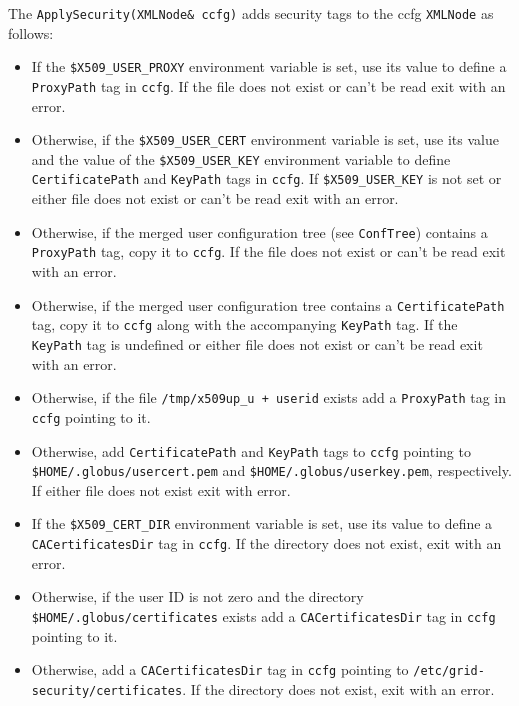 \documentclass{book}
\newcommand{\XMLNode}{\texttt{XMLNode}}
\begin{document}
The \texttt{ApplySecurity(XMLNode\& ccfg)} adds security tags to the
ccfg {\XMLNode} as follows:

\begin{itemize}
\item{If the \texttt{\$X509\_USER\_PROXY} environment variable is set,
  use its value to define a \texttt{ProxyPath} tag in \texttt{ccfg}. If
  the file does not exist or can't be read exit with an error.}
\item{Otherwise, if the \texttt{\$X509\_USER\_CERT} environment
  variable is set, use its value and the value of the
  \texttt{\$X509\_USER\_KEY} environment variable to define
  \texttt{CertificatePath} and \texttt{KeyPath} tags in \texttt{ccfg}.
  If \texttt{\$X509\_USER\_KEY} is not set or either file does not
  exist or can't be read exit with an error.}
\item{Otherwise, if the merged user configuration tree (see
  \texttt{ConfTree}) contains a \texttt{ProxyPath} tag, copy it to
  \texttt{ccfg}. If the file does not exist or can't be read exit with
  an error.}
\item{Otherwise, if the merged user configuration tree contains a
  \texttt{CertificatePath} tag, copy it to \texttt{ccfg} along with the
  accompanying \texttt{KeyPath} tag. If the \texttt{KeyPath} tag is
  undefined or either file does not exist or can't be read exit with
  an error.}
\item{Otherwise, if the file \texttt{/tmp/x509up\_u + userid} exists
  add a \texttt{ProxyPath} tag in \texttt{ccfg} pointing to it.}
\item{Otherwise, add \texttt{CertificatePath} and \texttt{KeyPath}
  tags to \texttt{ccfg} pointing to
  \texttt{\$HOME/.globus/usercert.pem} and
  \texttt{\$HOME/.globus/userkey.pem}, respectively. If either file
  does not exist exit with error.}
\item{If the \texttt{\$X509\_CERT\_DIR} environment variable is set,
  use its value to define a \texttt{CACertificatesDir} tag in
  \texttt{ccfg}. If the directory does not exist, exit with an error.}
\item{Otherwise, if the user ID is not zero and the directory
  \texttt{\$HOME/.globus/certificates} exists add a
  \texttt{CACertificatesDir} tag in \texttt{ccfg} pointing to it.}
\item{Otherwise, add a \texttt{CACertificatesDir} tag in \texttt{ccfg}
  pointing to \texttt{/etc/grid-security/certificates}. If the
  directory does not exist, exit with an error.}
\end{itemize}
\end{document}

